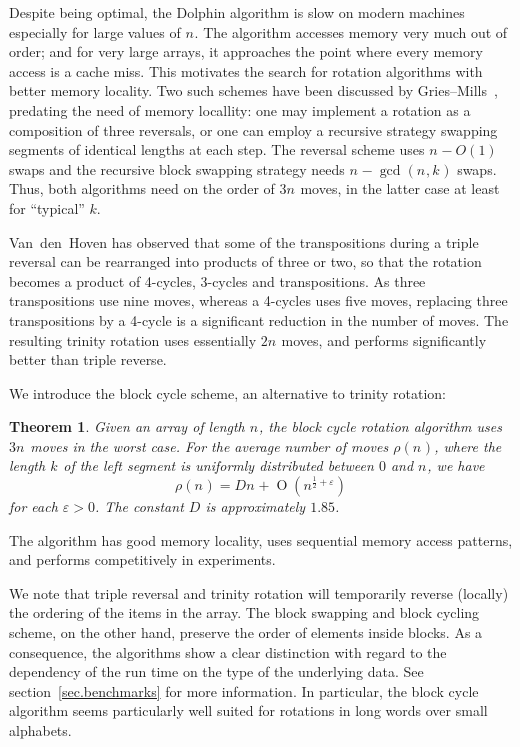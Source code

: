 \documentclass[12pt,a4paper]{article}
\newtheorem{main}{Theorem}
\newcommand{\notion}{}
\newcommand{\Size}[1][]{n_{#1}}
\newcommand{\Shift}[1][]{k_{#1}}
\newcommand{\AvgCostOf}[1]{\rho(#1)}
\newcommand{\TheCostConst}{D}
\newcommand{\BigO}[1]{\operatorname{O}(#1)}
\newcommand{\TheEpsilon}{\varepsilon}
\begin{document}
  Despite being optimal, the Dolphin algorithm is slow on modern
  machines especially for large values of $\Size$. The algorithm
  accesses memory very much out of order; and for very large arrays, it
  approaches the point where every memory access is a cache miss. This
  motivates the search for rotation algorithms with better memory
  locality. Two such schemes have been discussed by
  Gries--Mills~\cite{GriesMills81}, predating the need of memory
  locallity:
  one may implement a rotation as a
  composition of three reversals, or one can employ a recursive strategy
  swapping segments of identical lengths at each step. The reversal
  scheme uses $\Size-O(1)$ swaps and the recursive block swapping
  strategy needs $\Size-\gcd(\Size,\Shift)$ swaps. Thus, both algorithms
  need on the order of $3\Size$ moves, in the latter case at least for
  ``typical'' $k$.

  Van~den~Hoven \cite{VanDenHoven21} has observed that some of the
  transpositions during a triple reversal can be rearranged into
  products of three or two, so that the rotation becomes a product of
  4-cycles, 3-cycles and transpositions. As three transpositions use
  nine moves, whereas a 4-cycles uses five moves, replacing three
  transpositions by a 4-cycle is a significant reduction in the number
  of moves. The resulting \notion{trinity rotation} uses essentially
  $2\Size$ moves, and performs significantly better than triple reverse.

  We introduce the block cycle scheme, an alternative to trinity
  rotation:
  \begin{main}
    Given an array of length $\Size$, 
    the block cycle rotation algorithm uses $3\Size$ moves in the
    worst case. For the average number of moves $\AvgCostOf{\Size}$,
    where the length $\Shift$ of the left segment is uniformly
    distributed between $0$ and $\Size$, we have
    \[
      \AvgCostOf{\Size} =
      \TheCostConst\Size + \BigO{ \Size^{\frac12 + \TheEpsilon } }
    \]
    for each $\TheEpsilon > 0$. The constant $\TheCostConst$ is
    approximately $1.85$.
  \end{main}
  The algorithm has good memory locality, uses sequential memory
  access patterns, and performs competitively in experiments.

  We note that triple reversal and trinity rotation will temporarily
  reverse (locally) the ordering of the items in the array. The block
  swapping and block cycling scheme, on the other hand, preserve the
  order of elements inside blocks. As a consequence, the algorithms show
  a clear distinction with regard to the dependency of the run time on
  the type of the underlying data. See section~\ref{sec.benchmarks} for
  more information. In particular, the block cycle algorithm seems
  particularly well suited for rotations in long words over small
  alphabets.
\end{document}
